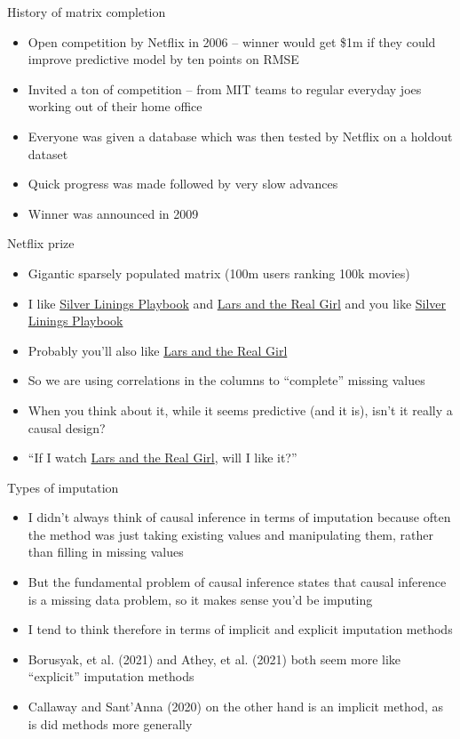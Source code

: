 \documentclass{beamer}
\begin{document}
\begin{frame}{History of matrix completion}

\begin{itemize}
\item Open competition by Netflix in 2006 -- winner would get \$1m if they could improve predictive model by ten points on RMSE
\item Invited a ton of competition -- from MIT teams to regular everyday joes working out of their home office
\item Everyone was given a database which was then tested by Netflix on a holdout dataset
\item Quick progress was made followed by very slow advances
\item Winner was announced in 2009
\end{itemize}

\end{frame}

\begin{frame}{Netflix prize}

\begin{itemize}
\item Gigantic sparsely populated matrix (100m users ranking 100k movies)
\item I like \underline{Silver Linings Playbook} and \underline{Lars and the Real Girl} and you like \underline{Silver Linings Playbook}
\item Probably you'll also like \underline {Lars and the Real Girl}
\item So we are using correlations in the columns to ``complete'' missing values
\item When you think about it, while it seems predictive (and it is), isn't it really a causal design?
\item ``If I watch \underline{Lars and the Real Girl}, will I like it?''
\end{itemize}

\end{frame}

\begin{frame}{Types of imputation}

\begin{itemize}
\item I didn't always think of causal inference in terms of imputation because often the method was just taking existing values and manipulating them, rather than filling in missing values
\item But the fundamental problem of causal inference states that causal inference is a missing data problem, so it makes sense you'd be imputing
\item I tend to think therefore in terms of implicit and explicit imputation methods
\item Borusyak, et al. (2021) and Athey, et al. (2021) both seem more like ``explicit'' imputation methods
\item Callaway and Sant'Anna (2020) on the other hand is an implicit method, as is did methods more generally
\end{itemize}

\end{frame}
\end{document}
